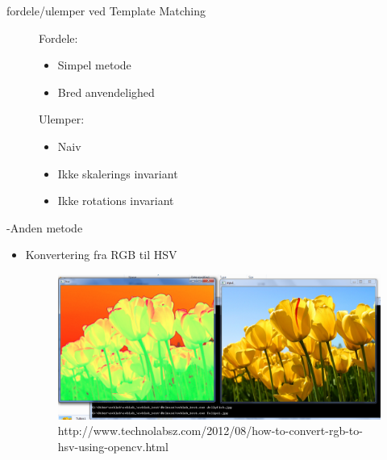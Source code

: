 \begin{frame}[fragile]{\insertsection}{fordele/ulemper ved Template Matching}
	\begin{figure}[t]
		\begin{minipage}[t]{.45\textwidth}
			Fordele:
			\begin{itemize}
				\item Simpel metode
				\item Bred anvendelighed
			\end{itemize}
		\end{minipage}
		\begin{minipage}[t]{.45\textwidth}
			Ulemper:			
			\begin{itemize}
				\item Naiv
				\item Ikke skalerings invariant
				\item Ikke rotations invariant
			\end{itemize}
		\end{minipage}
	\end{figure}
\end{frame}

\begin{frame}[fragile]{\insertsection}{\insertsubsection -Anden metode}

	\begin{itemize}
		\item Konvertering fra RGB til HSV
		\begin{figure}
			\begin{minipage}{.9\textwidth}
				\includegraphics[width=\textwidth]{pictures/rgbtohsv.png}
				\caption{http://www.technolabsz.com/2012/08/how-to-convert-rgb-to-hsv-using-opencv.html}
			\end{minipage}
		\end{figure}
	\end{itemize}
\end{frame}

